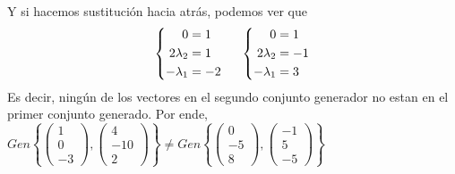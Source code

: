 \documentclass{article}
\begin{document}
\begin{enumerate}
\[        \]
        Y si hacemos sustitución hacia atrás, podemos ver que
        \[
            \left\{
            \begin{aligned}
                0 &= 1 \\
                2\lambda_2 &= 1 \\
                -\lambda_1 &= -2 \\
            \end{aligned}
            \right.
            \hspace{0.5cm}
            \left\{
            \begin{aligned}
                0 &= 1 \\
                2\lambda_2 &= -1 \\
                -\lambda_1 &= 3 \\
            \end{aligned}
            \right.
        \]
        Es decir, ningún de los vectores en el segundo conjunto generador no estan en el primer conjunto generado. 
        Por ende, 
        \(
            Gen
            \left\{
                \begin{pmatrix}
                    1 \\ 0 \\ -3
                \end{pmatrix},
                \begin{pmatrix}
                    4 \\ -10 \\ 2
                \end{pmatrix}
            \right\}
            \neq
            Gen
            \left\{
                \begin{pmatrix}
                    0 \\ -5 \\ 8
                \end{pmatrix},
                \begin{pmatrix}
                    -1 \\ 5 \\ -5
                \end{pmatrix}
            \right\}
        \)

\end{enumerate}
\end{document}
